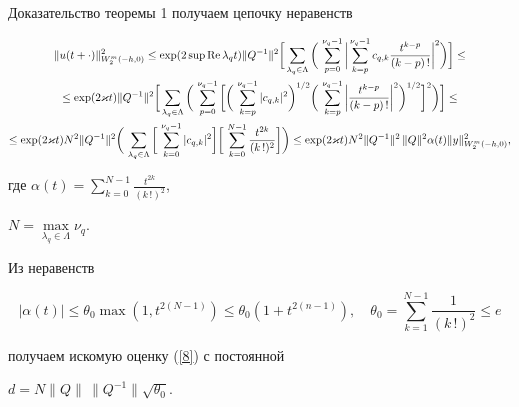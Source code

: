 \begin{pf*}{Доказательство теоремы 1}
получаем цепочку неравенств 


\begin{multline*} 


\label{22} 


\|u(t+\cdot)\|^2_{W^m_2(-h,0)}\le 


\exp(2\sup\re\lambda_q t)\|Q^{-1}\|^2


\bigg[\sum_{\lambda_q\in\Lambda}\bigg(\, 


\sum^{\nu_q-1}_{p=0}\bigg|\sum^{\nu_q-1}_{k=p} 


c_{q,k}\frac{t^{k-p}}{(k-p)\,!}\bigg|^2\bigg)\bigg]\le \\ 


%


\le\exp(2\varkappa t)\|Q^{-1}\|^2


\bigg[\sum_{\lambda_q\in\Lambda}\bigg(\, 


\sum^{\nu_q-1}_{p=0}\bigg[\bigg(\, 


\sum^{\nu_q-1}_{k=p}|c_{q,k}|^2


\bigg)^{1/2}\bigg(\,\sum^{\nu_q-1}_{k=p}\bigg| 


\frac{t^{k-p}}{(k-p)\,!}\bigg|^2\bigg)^{1/2}\bigg]^2\bigg)\bigg]\le \\ 


%


\le\exp(2\varkappa t)N^2\|Q^{-1}\|^2\bigg(\, 


\sum_{\lambda_q\in\Lambda}\bigg[\, 


\sum^{\nu_q-1}_{k=0}|c_{q,k}|^2\bigg]\bigg[\, 


\sum^{N-1}_{k=0}\frac{t^{2k}}{(k\,!)^2}\bigg]\bigg)\le


\exp(2\varkappa t)N^2\|Q^{-1}\|^2\,\|Q\|^2\alpha(t) 


\|y\|^2_{W^m_2(-h,0)}, 


\end{multline*} 


где $\alpha(t)=\sum\limits^{N-1}_{k=0}\frac{t^{2k}}{(k\,!)^2}$, 


$N=\max\limits_{\lambda_q\in\Lambda}\nu_q$. 


 


Из неравенств 


$$ 


|\alpha(t)|\le\theta_0\max(1,t^{2(N-1)})\le \theta_0 


(1+t^{2(n-1)}),\quad \theta_0=\sum^{N-1}_{k=1}\frac{1}{(k\,!)^2}\le e 


$$ 


получаем искомую оценку (\ref{8}) с постоянной 


$d=N\|Q\|\,\|Q^{-1}\|\sqrt{\theta_0}$. 


\end{pf*} 


